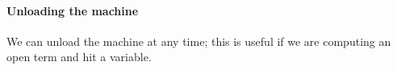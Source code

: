 \documentclass{article}
\newcommand\Clo[2]{#1\triangleleft{#2}}
\newcommand\Cons[2]{{#1}\dblcolon{#2}}
\newcommand\Frame[3]{\perfectparens{#1,#2,#3}}
\newcommand\Cfg[3]{\cut{\Clo{#1}{#2}}{#3}}
\begin{document}
\paragraph{Unloading the machine}

We can unload the machine at any time; this is useful if we are
computing an open term and hit a variable.

\end{document}
